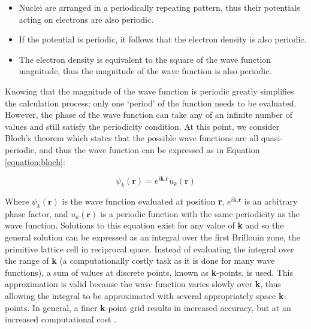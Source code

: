 \begin{itemize}

\item Nuclei are arranged in a periodically repeating pattern, thus their potentials acting on electrons are also periodic.

\item If the potential is periodic, it follows that the electron density is also periodic.

\item The electron density is equivalent to the square of the wave function magnitude, thus the magnitude of the wave function is also periodic.

\end{itemize}

Knowing that the magnitude of the wave function is periodic greatly simplifies the calculation process; only one `period' of the function needs to be evaluated. However, the phase of the wave function can take any of an infinite number of values and still satisfy the periodicity condition. At this point, we consider Bloch's theorem which states that the possible wave functions are all quasi-periodic, and thus the wave function can be expressed as in Equation \ref{equation:bloch}:  %

\begin{equation}
\label{equation:bloch}
\psi_k(\textbf{r}) = e^{i\textbf{k}.\textbf{r}}u_k(\textbf{r})
\end{equation}

Where $\psi_k(\textbf{r})$ is the wave function evaluated at position \textbf{r}, $e^{i\textbf{k}.\textbf{r}}$ is an arbitrary phase factor, and $u_k(\textbf{r})$ is a periodic function with the same periodicity as the wave function. Solutions to this equation exist for any value of \textbf{k} and so the general solution can be expressed as an integral over the first Brillouin zone, the primitive lattice cell in reciprocal space. Instead of evaluating the integral over the range of \textbf{k} (a computationally costly task as it is done for many wave functions), a sum of values at discrete points, known as \textbf{k}-points, is used. This approximation is valid because the wave function varies slowly over \textbf{k}, thus allowing the integral to be approximated with several appropriately space \textbf{k}-points. In general, a finer \textbf{k}-point grid results in increased accuracy, but at an increased computational cost \cite{Hasnip2010}.

